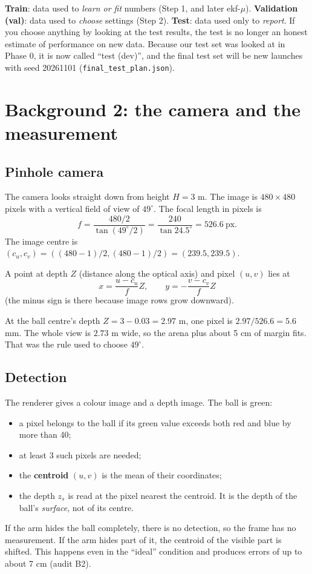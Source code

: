 \documentclass[11pt,a4paper]{article}
\begin{document}
\begin{idea}
\textbf{Train}: data used to \emph{learn or fit} numbers (Step 1, and later ekf-$\mu$).
\textbf{Validation (val)}: data used to \emph{choose} settings (Step 2).
\textbf{Test}: data used only to \emph{report}. If you choose anything by looking at the test results, the test is no longer
an honest estimate of performance on new data. Because our test set was looked at in Phase 0, it is now called
``test (dev)'', and the final test set will be new launches with seed 20261101 (\texttt{final\_test\_plan.json}).
\end{idea}

\section{Background 2: the camera and the measurement}

\subsection{Pinhole camera}
The camera looks straight down from height $H=3$ m. The image is $480\times480$ pixels with a vertical field of view of
$49^\circ$. The focal length in pixels is
\[ f = \frac{480/2}{\tan(49^\circ/2)} = \frac{240}{\tan 24.5^\circ} = 526.6\ \text{px}. \]
The image centre is $(c_u,c_v)=((480-1)/2,(480-1)/2)=(239.5,239.5)$.

A point at depth $Z$ (distance along the optical axis) and pixel $(u,v)$ lies at
\[ x = \frac{u-c_u}{f}Z,\qquad y = -\frac{v-c_v}{f}Z \]
(the minus sign is there because image rows grow downward).

\begin{example}
At the ball centre's depth $Z=3-0.03=2.97$ m, one pixel is $2.97/526.6 = 5.6$ mm. The whole view is $2.73$ m wide, so
the arena plus about 5 cm of margin fits. That was the rule used to choose $49^\circ$.
\end{example}

\subsection{Detection}
The renderer gives a colour image and a depth image. The ball is green:
\begin{itemize}
\item a pixel belongs to the ball if its green value exceeds both red and blue by more than 40;
\item at least 3 such pixels are needed;
\item the \textbf{centroid} $(u,v)$ is the mean of their coordinates;
\item the depth $z_s$ is read at the pixel nearest the centroid. It is the depth of the ball's \emph{surface}, not of its centre.
\end{itemize}
If the arm hides the ball completely, there is no detection, so the frame has no measurement. If the arm hides part of
it, the centroid of the visible part is shifted. This happens even in the ``ideal'' condition and produces errors of up to
about 7 cm (audit B2).
\end{document}
